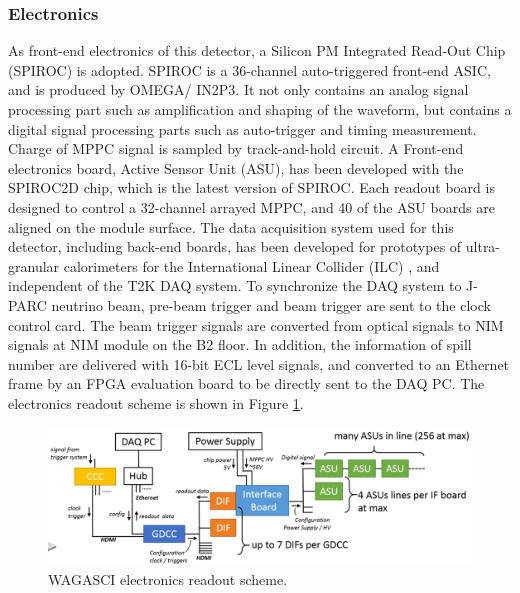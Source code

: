 \subsubsection{Electronics}
\label{sec:wagasci_elec}
As front-end electronics of this detector, a Silicon PM Integrated Read-Out Chip (SPIROC) \cite{spiroc} is adopted.
SPIROC is a 36-channel auto-triggered front-end ASIC, and is produced by OMEGA/ IN2P3. 
It not only contains an analog signal processing part such as amplification and shaping of the waveform, but contains a digital signal processing parts such as auto-trigger and timing measurement.
Charge of MPPC signal is sampled by track-and-hold circuit.
A Front-end electronics board, Active Sensor Unit (ASU), has been developed with the SPIROC2D chip, which is the latest version of SPIROC. 
Each readout board is designed to control a 32-channel arrayed MPPC, and 40 of the ASU boards are aligned on the module surface. 
The data acquisition system used for this detector, including back-end boards, has been developed for prototypes of ultra-granular calorimeters for the International Linear Collider (ILC) \cite{cal_ilc}, and independent of the T2K DAQ system.
To synchronize the DAQ system to J- PARC neutrino beam, pre-beam trigger and beam trigger are sent to the clock control card.
The beam trigger signals are converted from optical signals to NIM signals at NIM module on the B2 floor.
In addition, the information of spill number are delivered with 16-bit ECL level signals, and converted to an Ethernet frame by an FPGA evaluation board to be directly sent to the DAQ PC.
The electronics readout scheme is shown in Figure \ref{fig:wagasci_elec_scheme}.

\begin{figure}[tbh]
\begin{center}
\includegraphics[width=1.0\linewidth]{fig/wagasci_elec_scheme.pdf}
\end{center}
\caption{
WAGASCI electronics readout scheme.
}
\label{fig:wagasci_elec_scheme}
\end{figure}


